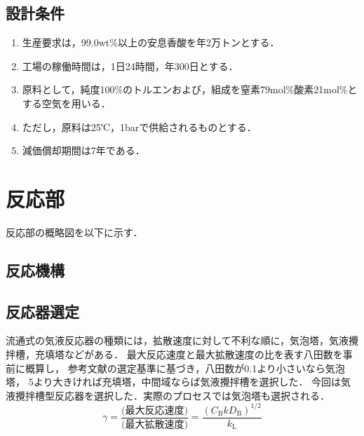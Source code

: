 \documentclass[a4j]{jsreport}
\begin{document}
\section{設計条件}
\begin{enumerate}
    \item 生産要求は，99.0wt\%以上の安息香酸を年2万トンとする．\\
    \item 工場の稼働時間は，1日24時間，年300日とする．\\
    \item 原料として，純度100\%のトルエンおよび，組成を窒素79mol\%酸素21mol\%とする空気を用いる．\\
    \item ただし，原料は25℃，1barで供給されるものとする．\\
    \item 減価償却期間は7年である．
\end{enumerate}

\newpage
\chapter{反応部}
反応部の概略図を以下に示す．

\section{反応機構}

\section{反応器選定}
流通式の気液反応器の種類には，拡散速度に対して不利な順に，気泡塔，気液攪拌槽，充填塔などがある．
最大反応速度と最大拡散速度の比を表す八田数を事前に概算し，
参考文献\cite{化工便覧}の選定基準に基づき，八田数が0.1より小さいなら気泡塔，
5より大きければ充填塔，中間域ならば気液攪拌槽を選択した．
今回は気液攪拌槽型反応器を選択した．実際のプロセスでは気泡塔も選択される．\\
\begin{equation}
    \gamma = \frac{\text{(最大反応速度)}}{\text{(最大拡散速度)}} = \frac{(C_\mathrm{B}kD_\mathrm{B})^{1/2}} {k_\mathrm{L}}
\end{equation}
\end{document}
